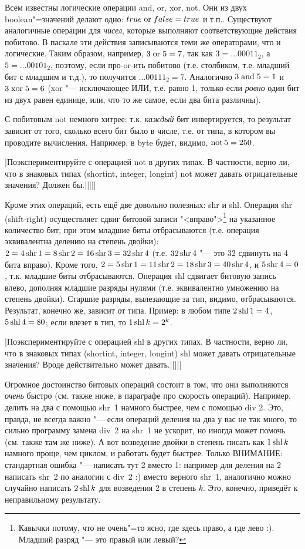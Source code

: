  Всем известны логические операции and, or, xor, not. Они из двух 
boolean"=значений делают одно: $true \mathrel{\mathrm{or}} false = true$ и т.п.. Существуют аналогичные операции
для \textit{чисел}, которые выполняют соответствующие действия побитово. В паскале эти действия
записываются теми же операторами, что и логические. Таким образом, например, $3 \mathrel{\mathrm{or}} 5= 7$, так как
$3=\dots00011_2$, а $5=\dots00101_2$, поэтому, если про-or-ить побитово (т.е. столбиком, т.е. 
младший бит с младшим и т.д.), то 
получится $\dots00111_2=7$. Аналогично $3 \mathrel{\mathrm{and}} 5 = 1$ и $3 \mathrel{\mathrm{xor}} 5 = 6$ (xor "--- исключающее ИЛИ, 
т.е. равно 1, только если \textit{ровно} один бит из двух равен единице, или, что то же самое, если 
два бита различны).

С побитовым not немного хитрее: т.к. \textit{каждый} бит инвертируется, то результат зависит от 
того, сколько всего бит было в числе, т.е. от типа, в котором вы проводите вычисления. Например, в 
byte будет, видимо, $\mathop{\mathrm{not}} 5= 250$.

\task|Поэкспериментируйте с операцией not в других типах. В частности, верно ли, что в 
знаковых типах (shortint, integer, longint) not может давать отрицательные значения? Должен бы.|||||

Кроме этих операций, есть ещё две довольно полезных: shr и shl. Операция shr (shift-right) осуществляет 
сдвиг битовой записи "<вправо">\footnote{Кавычки потому, что не очень"=то ясно, где здесь право, а 
где лево :). Младший разряд "--- это правый или левый?} на указанное количество бит, при этом 
младшие биты отбрасываются (т.е. операция эквивалентна  
делению на степень двойки): $2=4 \mathop{\mathrm{shr}} 1=8 \mathop{\mathrm{shr}} 2=16\mathop{\mathrm{shr}} 3=32\mathop{\mathrm{shr}} 4$ (т.е. $32 \mathop{\mathrm{shr}} 4$ "--- это 32 
сдвинуть на 4 бита вправо). Кроме того, $2=5\mathop{\mathrm{shr}} 1=11\mathop{\mathrm{shr}} 2=18\mathop{\mathrm{shr}} 3=40\mathop{\mathrm{shr}} 4$, и $5\mathop{\mathrm{shr}} 4=0$, т.к. младшие биты 
отбрасываются. Операция shl сдвигает битовую запись влево, дополняя младшие разряды нулями (т.е. 
эквивалентно умножению на степень двойки). Старшие 
разряды, вылезающие за тип, видимо, отбрасываются. Результат, конечно же, зависит от типа. Пример: 
в любом типе $2\mathop{\mathrm{shl}} 1=4$, $5\mathop{\mathrm{shl}} 4=80$; если влезет в тип, то $1\mathop{\mathrm{shl}} k=2^k$.

\task|Поэкспериментируйте с операцией shl в других типах. В частности, верно ли, что в 
знаковых типах (shortint, integer, longint) shl может давать отрицательные значения? Вроде действительно может давать.|||||

Огромное достоинство битовых операций состоит в том, что они выполняются \textit{очень} быстро (см.
также ниже, в параграфе про скорость операций). Например, делить на два с помощью shr~1 намного 
быстрее, чем с помощью div 2. Это, правда, не всегда важно "--- если операций деления на два у вас 
не так много, то сильно программу замена div~2 на shr~1 не ускорит, но иногда может помочь (см. также там же ниже). А вот возведение 
двойки в степень писать как $1\mathop{\mathrm{shl}} k$ намного проще, чем циклом, и работать будет быстрее. Только 
ВНИМАНИЕ: стандартная ошибка "--- написать тут 2 вместо 1: например для деления на 2 написать 
shr~2 по аналогии с div~2 :) вместо верного shr~1, аналогично можно случайно написать $2\mathop{\mathrm{shl}} k$ для 
возведения 2 в степень $k$. Это, конечно, приведёт к неправильному результату.

